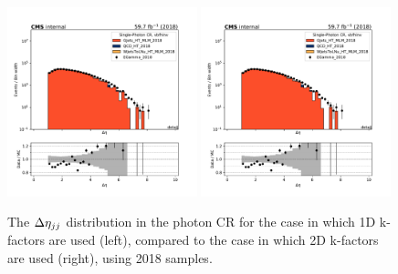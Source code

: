 \begin{figure}
    \begin{center}
        \includegraphics[width=0.49\textwidth]{fig/datamc/cr_g_vbf/cr_g_vbf_detajj_losf_2018.pdf}
        \includegraphics[width=0.49\textwidth]{fig/datamc_2dkfac/cr_g_vbf/cr_g_vbf_detajj_losf_2018.pdf} 
        \caption{The $\Delta \eta_{jj}$ distribution in the photon CR for the case in which 1D k-factors are used (left), 
        compared to the case in which 2D k-factors are used (right), using 2018 samples.}
        \label{fig:detajj_2018}
    \end{center}
\end{figure}

